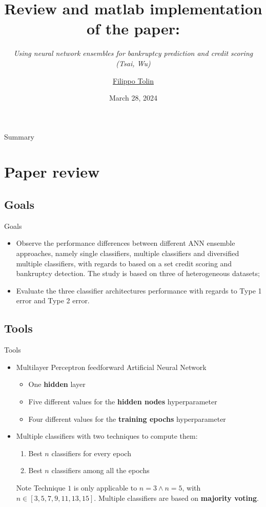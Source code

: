 \documentclass[12pt]{beamer}
\title[EM2091]{Review and matlab implementation of the paper:} %
\subtitle{\textit{Using neural network ensembles for bankruptcy prediction and credit scoring (Tsai, Wu)}}
\author[Filippo Tolin]{
    \href{mailto:874631@stud.unive.it}{Filippo Tolin}
}
\institute[Ca' Foscari]{Ca' Foscari University of Venice }
\date{March 28, 2024}
\begin{document}
\begin{frame}
\titlepage
\end{frame}

\begin{frame}{Summary}
\tableofcontents 
\end{frame}

\section{Paper review}

\subsection{Goals}

\begin{frame}{Goals}
  \begin{itemize}
    \item Observe the performance differences between different ANN ensemble
      approaches, namely single classifiers,
      multiple classifiers and diversified multiple classifiers, with regards to based on a set
      credit scoring and bankruptcy detection. The study is based on three
      of heterogeneous datasets;
    \item Evaluate the three classifier architectures performance with regards to
      Type 1 error and Type 2 error.
  \end{itemize}
\end{frame}

\subsection{Tools}

\begin{frame}{Tools}
  \begin{itemize}
    \item Multilayer Perceptron feedforward Artificial Neural Network
      \begin{itemize}
        \item One \textbf{hidden} layer
        \item Five different values for the \textbf{hidden nodes} hyperparameter
        \item Four different values for the \textbf{training epochs} hyperparameter
      \end{itemize}
    \item Multiple classifiers with two techniques to compute them:
      \begin{enumerate}
        \item Best $n$ classifiers for every epoch
        \item Best $n$ classifiers among all the epochs
      \end{enumerate}
      \begin{block}{Note}
        Technique $1$ is only applicable to $n=3 \wedge n=5$,
        with $n \in [3,5,7,9,11,13,15]$. Multiple classifiers are based on \textbf{majority voting}.
      \end{block}
  \end{itemize}
\end{frame}
\end{document}
